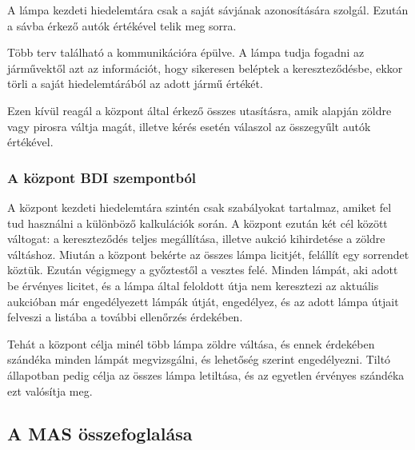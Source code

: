 \documentclass[a4paper, 11pt]{article}
\begin{document}
A lámpa kezdeti hiedelemtára csak a saját sávjának azonosítására szolgál. Ezután a sávba érkező autók
értékével telik meg sorra.

Több terv található a kommunikációra épülve. A lámpa tudja fogadni az járművektől azt az információt, hogy
sikeresen beléptek a kereszteződésbe, ekkor törli a saját hiedelemtárából az adott jármű értékét.

Ezen kívül reagál a központ által érkező összes utasításra, amik alapján zöldre vagy pirosra váltja magát,
illetve kérés esetén válaszol az összegyűlt autók értékével.

\subsubsection{A központ BDI szempontból}
A központ kezdeti hiedelemtára szintén csak szabályokat tartalmaz, amiket fel tud használni a különböző
kalkulációk során. A központ ezután két cél között váltogat: a kereszteződés teljes megállítása, illetve
aukció kihirdetése a zöldre váltáshoz. Miután a központ bekérte az összes lámpa licitjét, felállít egy sorrendet
köztük. Ezután végigmegy a győztestől a vesztes felé. Minden lámpát, aki adott be érvényes licitet, és
a lámpa által feloldott útja nem keresztezi az aktuális aukcióban már engedélyezett lámpák útját, engedélyez,
és az adott lámpa útjait felveszi a listába a további ellenőrzés érdekében.

Tehát a központ célja minél több lámpa zöldre váltása, és ennek érdekében szándéka minden lámpát megvizsgálni,
és lehetőség szerint engedélyezni. Tiltó állapotban pedig célja az összes lámpa letiltása, és az egyetlen érvényes
szándéka ezt valósítja meg.
\subsection{A MAS összefoglalása}
\end{document}
